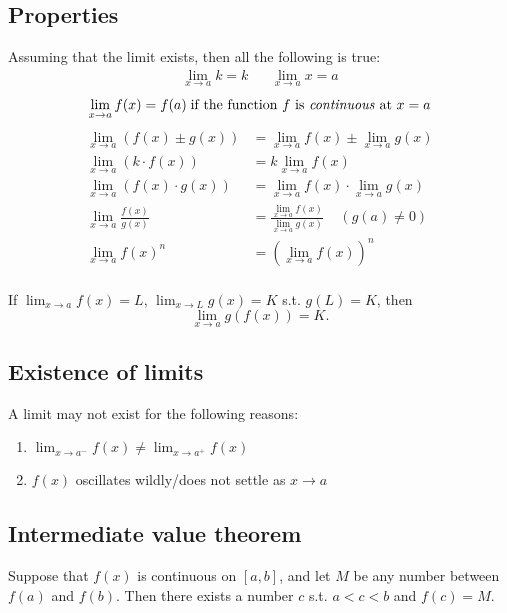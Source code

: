 \documentclass[main.tex]{subfiles}
\begin{document}
\begin{multicols}{2}
	\subsection*{Properties}
	Assuming that the limit exists, then all the following is true:
	\begin{align*}
		\lim_{x \to a} k = k && \lim_{x \to a} x = a
	\end{align*}
	\begin{equation*}
		\lim_{x \to a} f(x) = f(a) \; \text{if the function \(f\) is \emph{continuous} at \(x = a\)}
	\end{equation*}
	\begin{align*}
		\lim_{x \to a}(f(x) \pm g(x)) &= \lim_{x \to a}f(x) \pm \lim_{x \to a}g(x) \\
		\lim_{x \to a}(k \cdot f(x)) &= k \lim_{x \to a}f(x) \\
		\lim_{x \to a}(f(x) \cdot g(x)) &= \lim_{x \to a}{f(x)} \cdot \lim_{x \to a}{g(x)} \\
		\lim_{x \to a} \frac{f(x)}{g(x)} &= \frac{\lim_{x \to a} f(x)}{\lim_{x \to a} g(x)} \;\;\;\; (g(a) \neq 0) \\
		\lim_{x \to a}f(x)^n &= \left( \lim_{x \to a}{f(x)}\right)^n \\
	\end{align*}

	If \(\displaystyle \lim_{x \to a} f(x) = L\), \(\displaystyle \lim_{x \to L} g(x) = K\) s.t. \(g(L) = K\), then
	\begin{equation*}
		\lim_{x \to a} g(f(x)) = K.
	\end{equation*}


	\subsection*{Existence of limits}
	A limit may not exist for the following reasons:
	\begin{enumerate}
		\item \(\lim_{x \to a^{-}}{f(x)} \neq \lim_{x \to a^{+}}{f(x)}\)
		\item \(f(x)\) oscillates wildly/does not settle as \(x \to a\)
	\end{enumerate}

	\subsection*{Intermediate value theorem}
	\begin{theorem}
	Suppose that \(f(x)\) is continuous on \([a, b]\), and let \(M\) be any number between \(f(a)\) and \(f(b)\). Then there exists a number \(c\) s.t. \(a < c < b\) and \(f(c) = M\).
	\end{theorem}


\end{multicols}
\end{document}
